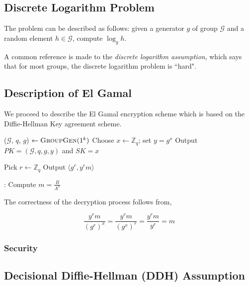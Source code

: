 \subsection{Discrete Logarithm Problem}

The problem can be described as follows: given a generator $ g $ of group $ \mathcal{G} $ and a random element $ h \in \mathcal{G} $, compute $ \log_g h $.

A common reference is made to the \textit{discrete logarithm assumption}, which says that for most groups, the discrete logarithm problem is ``hard".

\subsection{Description of El Gamal}

We proceed to describe the El Gamal encryption scheme which is based on the Diffie-Hellman Key agreement scheme.

\smallskip


\begin{algorithmic}
\STATE ($ \mathcal{G} $, $ q $, $ g $) $ \leftarrow \textsc{GroupGen} (1^k) $ 
\STATE Choose $ x \leftarrow \mathbb{Z}_q $; set $ y = g^x $ 
\STATE Output $ PK = ( \mathcal{G}, q, g, y) $ and $ SK = x $ 
\end{algorithmic} 

\smallskip

\begin{algorithmic}
\STATE Pick $ r \leftarrow \mathbb{Z}_q $ 
\STATE Output $ \langle g^r, y^r m \rangle $ 
\end{algorithmic} 

\smallskip

\begin{algorithmic}
:
\STATE Compute $ m = \frac{B}{A^x} $ 
\end{algorithmic}

The correctness of the decryption process follows from,

\begin{equation*}
\frac{y^r m}{(g^r)^x} = \frac{y^r m}{(g^x)^r} = \frac{y^r m }{y^r} = m
\end{equation*}

\subsubsection{Security}


\subsection{Decisional Diffie-Hellman (DDH) Assumption}
